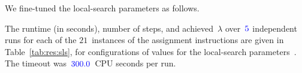 We fine-tuned the local-search parameters as follows.  

\newcommand{\TimeoutSLS}{\todo{300.0}}  %
\newcommand{\RunsSLS}{\todo{5}}         %

The  runtime (in seconds),  number of steps,
and  achieved~$\lambda$ over~$\RunsSLS$ independent runs
for each of the $21$~instances of the assignment instructions are
given in Table~\ref{tab:res:sls}, for  configurations
of values for the local-search parameters~.
The timeout was~$\TimeoutSLS$~CPU seconds per run.%
%

